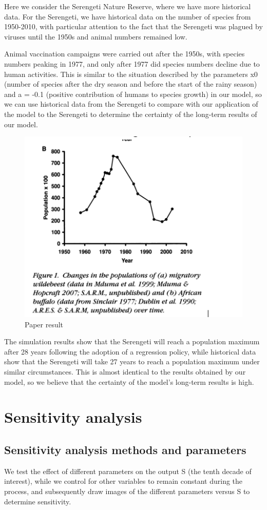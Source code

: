 \documentclass{mcmthesis}
\numberwithin{figure}{section}
\numberwithin{table}{section}
\numberwithin{equation}{section}
\begin{document}
Here we consider the Serengeti Nature Reserve, where we have more historical data. For the Serengeti, we have historical data on the number of species from 1950-2010, with particular attention to the fact that the Serengeti was plagued by viruses until the 1950s and animal numbers remained low.\cite{10}

Animal vaccination campaigns were carried out after the 1950s, with species numbers peaking in 1977, and only after 1977 did species numbers decline due to human activities. This is similar to the situation described by the parameters x0 (number of species after the dry season and before the start of the rainy season) and a = -0.1 (positive contribution of humans to species growth) in our model, so we can use historical data from the Serengeti to compare with our application of the model to the Serengeti to determine the certainty of the long-term results of our model.


\begin{figure}
	\centering
	\includegraphics[width=0.5\linewidth]{./figures/Q3P.png}
	\caption{Paper result}
	\label{F 7.3}
\end{figure}


The simulation results show that the Serengeti will reach a population maximum after 28 years following the adoption of a regression policy, while historical data show that the Serengeti will take 27 years to reach a population maximum under similar circumstances. This is almost identical to the results obtained by our model, so we believe that the certainty of the model's long-term results is high.

\section{Sensitivity analysis}
\subsection{Sensitivity analysis methods and parameters}
We test the effect of different parameters on the output S (the tenth decade of interest), while we control for other variables to remain constant during the process, and subsequently draw images of the different parameters versus S to determine sensitivity.
\end{document}
